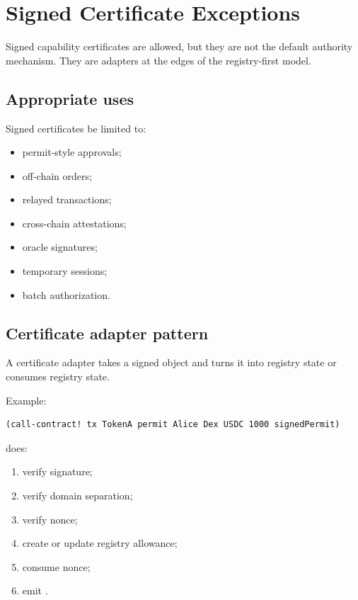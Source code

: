 \section{Signed Certificate Exceptions}

Signed capability certificates are allowed, but they are not the default authority mechanism. They are adapters at the edges of the registry-first model.

\subsection{Appropriate uses}

Signed certificates \SHOULD{} be limited to:

\begin{itemize}
  \item permit-style approvals;
  \item off-chain orders;
  \item relayed transactions;
  \item cross-chain attestations;
  \item oracle signatures;
  \item temporary sessions;
  \item batch authorization.
\end{itemize}

\subsection{Certificate adapter pattern}

A certificate adapter takes a signed object and turns it into registry state or consumes registry state.

Example:

\begin{lstlisting}
(call-contract! tx TokenA permit Alice Dex USDC 1000 signedPermit)
\end{lstlisting}

 does:

\begin{enumerate}
  \item verify signature;
  \item verify domain separation;
  \item verify nonce;
  \item create or update registry allowance;
  \item consume nonce;
  \item emit .
\end{enumerate}

